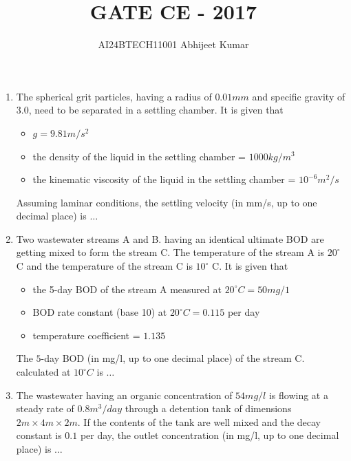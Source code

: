 \documentclass[journal]{IEEEtran}
\begin{document}

\vspace{3cm}


\renewcommand{\thefigure}{\theenumi}
\renewcommand{\thetable}{\theenumi}
\setlength{\intextsep}{10pt} %


\renewcommand{\thetable}{\theenumi}

\title{GATE CE - 2017}
\author{AI24BTECH11001 Abhijeet Kumar
}
\maketitle
\renewcommand{\thefigure}{\theenumi}
\renewcommand{\thetable}{\theenumi}
\begin{enumerate}[start=53]
    \item The spherical grit particles, having a radius of $0.01 mm$ and specific gravity of $3.0$, need to be separated in a settling chamber. It is given that
    \begin{itemize}
        \item $g = 9.81 m/s^2$
        \item the density of the liquid in the settling chamber = $1000 kg/m^3$
        \item the kinematic viscosity of the liquid in the settling chamber = $10^{-6} m^2/s$
    \end{itemize}
    Assuming laminar conditions, the settling velocity (in mm/s, up to one decimal place) is $\dots$

    \item Two wastewater streams A and B. having an identical ultimate BOD are getting mixed to form the stream C. The temperature of the stream A is $20^\circ$ C and the temperature of the stream C is $10^\circ$ C. It is given that
    \begin{itemize}
        \item the 5-day BOD of the stream A measured at $20^\circ C = 50 mg/1$
        \item BOD rate constant (base 10) at $20^\circ C = 0.115$ per day
        \item temperature coefficient = $1.135$
    \end{itemize}
    The $5$-day BOD (in mg/l, up to one decimal place) of the stream C. calculated at $10^\circ C$ is $\dots$

    \item The wastewater having an organic concentration of $54 mg/l$ is flowing at a steady rate of $0.8 m^3/day$ through a detention tank of dimensions $2 m \times 4 m \times 2 m$. If the contents of the tank are well mixed and the decay constant is $0.1$ per day, the outlet concentration (in mg/l, up to one decimal place) is $\dots$


\end{enumerate}
\end{document}
